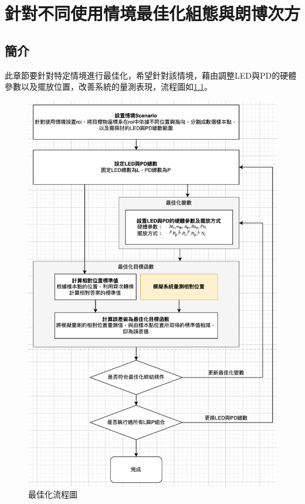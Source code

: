 \chapter{針對不同使用情境最佳化組態與朗博次方}
\label{chp:5}


\section{簡介}

此章節要針對特定情境進行最佳化，希望針對該情境，藉由調整LED與PD的硬體參數以及擺放位置，改善系統的量測表現，流程圖如\ref{flow:opt}。

\begin{figure}[ht]
    \centering
    \includegraphics[width=13cm]{ch4pic/flowchart_opt.png}
    \caption{最佳化流程圖}
    \label{flow:opt}
\end{figure}

